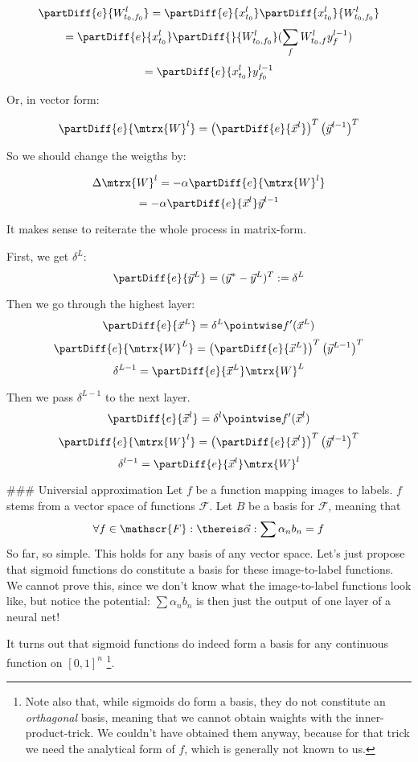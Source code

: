 $$ \partDiff{e}{W_{t_0, f_0}^l} = \partDiff{e}{x_{t_0}^l} \partDiff{x_{t_0}^l}{W_{t_0, f_0}^l}   $$
$$                              = \partDiff{e}{x_{t_0}^l} \partDiff{}{W_{t_0, f_0}^l} ( \sum_f W_{t_0, f}^l y_f^{l-1} ) $$
$$                              = \partDiff{e}{x_{t_0}^l} y_{f_0}^{l-1} $$

Or, in vector form: 

$$ \partDiff{e}{\mtrx{W}^l} = \left( \partDiff{e}{\vec{x}^l} \right)^T  \left( \vec{y}^{l-1} \right)^T $$ 

So we should change the weigths by: 

$$ \Delta \mtrx{W}^l = - \alpha \partDiff{e}{\mtrx{W}^l} $$
$$ = - \alpha \partDiff{e}{\vec{x}^l} \vec{y}^{l-1} $$


It makes sense to reiterate the whole process in matrix-form. 

First, we  get $\delta^L$:
$$ \partDiff{e}{\vec{y}^L} = (\vec{y}^* - \vec{y}^L)^T := \delta^L $$ 

Then we go through the highest layer:
$$ \partDiff{e}{\vec{x}^L} = \delta^L \pointwise f'(\vec{x}^L)  $$
$$ \partDiff{e}{\mtrx{W}^L} = \left( \partDiff{e}{\vec{x}^L} \right)^T \left( \vec{y}^{L-1} \right)^T $$
$$ \delta^{L-1} = \partDiff{e}{\vec{x}^L} \mtrx{W}^L $$

Then we pass $\delta^{L-1}$ to the next layer. 
$$ \partDiff{e}{\vec{x}^l} = \delta^l \pointwise f'(\vec{x}^l)  $$
$$ \partDiff{e}{\mtrx{W}^l} = \left( \partDiff{e}{\vec{x}^l} \right)^T  \left( \vec{y}^{l-1} \right)^T $$
$$ \delta^{l-1} = \partDiff{e}{\vec{x}^l} \mtrx{W}^l $$



### Universial approximation
Let $f$ be a function mapping images to labels. $f$ stems from a vector space of functions $\mathscr{F}$. Let $B$ be a basis for $\mathscr{F}$, meaning that 
$$ \forall f \in \mathscr{F}: \thereis \vec{\alpha}: \sum \alpha_n b_n = f $$
So far, so simple. This holds for any basis of any vector space. Let's just propose that sigmoid functions do constitute a basis for these image-to-label functions. We cannot prove this, since we don't know what the image-to-label functions look like, but notice the potential: 
$ \sum \alpha_n b_n $ is then just the output of one layer of a neural net!

It turns out that sigmoid functions do indeed form a basis for any continuous function on $[0,1]^n$ \footnote{Note also that, while sigmoids do form a basis, they do not constitute an \emph{orthagonal} basis, meaning that we cannot obtain waights with the inner-product-trick. We couldn't have obtained them anyway, because for that trick we need the analytical form of $f$, which is generally not known to us.}.

